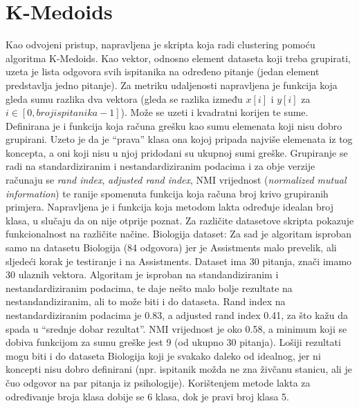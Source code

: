 \section{K-Medoids}
Kao odvojeni pristup, napravljena je skripta koja radi clustering pomoću algoritma K-Medoids.\newline
Kao vektor, odnosno element dataseta koji treba grupirati, uzeta je lista odgovora svih ispitanika na određeno pitanje (jedan element predstavlja jedno pitanje). Za metriku udaljenosti napravljena je funkcija koja gleda sumu razlika dva vektora (gleda se razlika između $x[i]$ i $y[i]$ za $i \in [0, broj ispitanika-1]$). Može se uzeti i kvadratni korijen te sume.\newline
Definirana je i funkcija koja računa grešku kao sumu elemenata koji nisu dobro grupirani. Uzeto je da je “prava” klasa ona kojoj pripada najviše elemenata iz tog koncepta, a oni koji nisu u njoj pridodani su ukupnoj sumi greške. 
Grupiranje se radi na standardiziranim i nestandardiziranim podacima i za obje verzije računaju se \textit{rand index}, \textit{adjusted rand index}, NMI vrijednost (\textit{normalized mutual information}) te ranije spomenuta funkcija koja računa broj krivo grupiranih primjera.\newline
Napravljena je i funkcija koja metodom lakta određuje idealan broj klasa, u slučaju da on nije otprije poznat.
\newline
\newline
Za različite datasetove skripta pokazuje funkcionalnost na različite načine.\newline
Biologija dataset:\newline
Za sad je algoritam isproban samo na datasetu Biologija (84 odgovora) jer je Assistments malo prevelik, ali sljedeći korak je testiranje i na Assistments.\newline
Dataset ima 30 pitanja, znači imamo 30 ulaznih vektora. Algoritam je isproban na standandiziranim i nestandardiziranim podacima, te daje nešto malo bolje rezultate na nestandandiziranim, ali to može biti i do dataseta. 
Rand index na nestandardiziranim podacima je 0.83, a adjusted rand index 0.41, za što kažu da spada u “srednje dobar rezultat”. NMI vrijednost je oko 0.58, a minimum koji se dobiva funkcijom za sumu greške jest 9 (od ukupno 30 pitanja). Lošiji rezultati mogu biti i do dataseta Biologija koji je svakako daleko od idealnog, jer ni koncepti nisu dobro definirani (npr. ispitanik možda ne zna živčanu stanicu, ali je čuo odgovor na par pitanja iz psihologije). 
Korištenjem metode lakta za određivanje broja klasa dobije se 6 klasa, dok je pravi broj klasa 5.\newline
